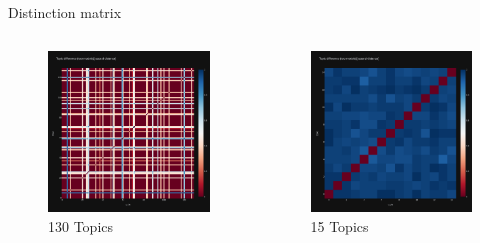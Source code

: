 \documentclass[aspectratio=169,xcolor=dvipsnames]{beamer}
\begin{document}
\begin{frame}{Distinction matrix}
    \vspace*{-5mm}
    \begin{columns}
        \hspace{-5mm}
        \begin{column}{.7\textwidth}
            \begin{figure}
                \centering
                \includegraphics[width=.65\linewidth]{images/dem_dem_diff_130.png}
                \caption{130 Topics}
                \label{fig:dem_dem_diff_130}
            \end{figure}
        \end{column}
        \hspace*{-2cm}
       \begin{column}{.7\textwidth}
            \begin{figure}
                \centering
                \includegraphics[width=.65\linewidth]{images/dem_dem_diff_15.png}
                \caption{15 Topics}
                \label{fig:dem_rep_diff_130}
            \end{figure}
        \end{column}
    \end{columns}
\end{frame}
\end{document}
